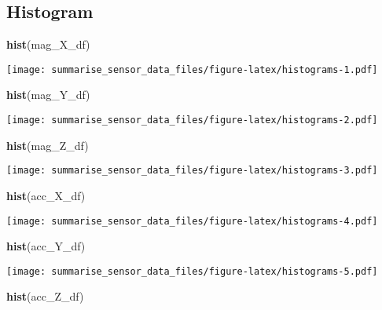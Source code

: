 \documentclass[]{article}
\newenvironment{Shaded}{\begin{snugshade}}{\end{snugshade}}
\newcommand{\KeywordTok}[1]{\textcolor[rgb]{0.13,0.29,0.53}{\textbf{#1}}}
\newcommand{\NormalTok}[1]{#1}
\begin{document}
\hypertarget{histogram}{%
\subsection{Histogram}\label{histogram}}

\begin{Shaded}
\begin{Highlighting}[]
\KeywordTok{hist}\NormalTok{(mag_X_df)}
\end{Highlighting}
\end{Shaded}

\texttt{[image: summarise\_sensor\_data\_files/figure-latex/histograms-1.pdf]}

\begin{Shaded}
\begin{Highlighting}[]
\KeywordTok{hist}\NormalTok{(mag_Y_df)}
\end{Highlighting}
\end{Shaded}

\texttt{[image: summarise\_sensor\_data\_files/figure-latex/histograms-2.pdf]}

\begin{Shaded}
\begin{Highlighting}[]
\KeywordTok{hist}\NormalTok{(mag_Z_df)}
\end{Highlighting}
\end{Shaded}

\texttt{[image: summarise\_sensor\_data\_files/figure-latex/histograms-3.pdf]}

\begin{Shaded}
\begin{Highlighting}[]
\KeywordTok{hist}\NormalTok{(acc_X_df)}
\end{Highlighting}
\end{Shaded}

\texttt{[image: summarise\_sensor\_data\_files/figure-latex/histograms-4.pdf]}

\begin{Shaded}
\begin{Highlighting}[]
\KeywordTok{hist}\NormalTok{(acc_Y_df)}
\end{Highlighting}
\end{Shaded}

\texttt{[image: summarise\_sensor\_data\_files/figure-latex/histograms-5.pdf]}

\begin{Shaded}
\begin{Highlighting}[]
\KeywordTok{hist}\NormalTok{(acc_Z_df)}
\end{Highlighting}
\end{Shaded}
\end{document}
